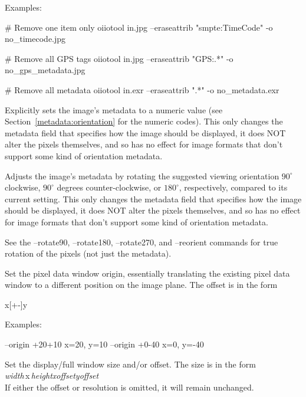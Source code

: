 \noindent Examples:

\begin{code}
    # Remove one item only
    oiiotool in.jpg --eraseattrib "smpte:TimeCode" -o no_timecode.jpg

    # Remove all GPS tags
    oiiotool in.jpg --eraseattrib "GPS:.*" -o no_gps_metadata.jpg

    # Remove all metadata
    oiiotool in.exr --eraseattrib ".*" -o no_metadata.exr
\end{code}
\apiend

Explicitly sets the image's  metadata to a numeric
value (see Section~\ref{metadata:orientation} for the numeric codes).
This only changes the metadata field that specifies
how the image should be displayed, it does NOT alter the pixels
themselves, and so has no effect for image formats that don't
support some kind of orientation metadata.
\apiend

Adjusts the image's  metadata by rotating
the suggested viewing orientation $90^\circ$
clockwise, $90^\circ$ degrees counter-clockwise, or $180^\circ$,
respectively, compared to its current setting.  This only changes the
metadata field that specifies how the image should be displayed, it does
NOT alter the pixels themselves, and so has no effect for image formats
that don't support some kind of orientation metadata.

See the {\cf --rotate90}, {\cf --rotate180}, {\cf --rotate270}, and
{\cf --reorient} commands for true rotation of the pixels (not just the
metadata).
\apiend

Set the pixel data window origin, essentially translating the existing
pixel data window to a different position on the image plane.
The offset is in the form
\begin{code}
     [+-]x[+-]y
\end{code}
\noindent Examples:
\begin{code}
    --origin +20+10           x=20, y=10
    --origin +0-40            x=0, y=-40
\end{code}
\apiend

Set the display/full window size and/or offset.  The size is in the
form 
\\ \emph{width}\,{\cf x}\,\emph{height}{\cf [+-]}\emph{xoffset}{\cf
  [+-]}\emph{yoffset} \\
If either the offset or resolution is omitted, it will remain
unchanged.

